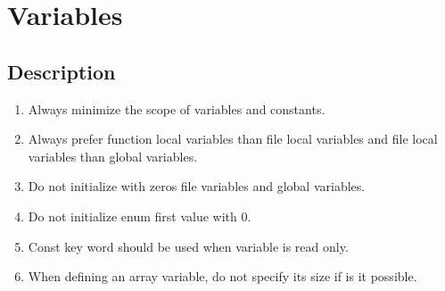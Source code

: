 \section{Variables}
\subsection{Description}
\begin{enumerate}
    \item Always minimize the scope of variables and constants.
    \item Always prefer function local variables than file local variables and file local variables than global variables.
    \item Do not initialize with zeros file variables and global variables.
    \item Do not initialize enum first value with 0.
    \item Const key word should be used when variable is read only.
    \item When defining an array variable, do not specify its size if is it possible.
\end{enumerate}

